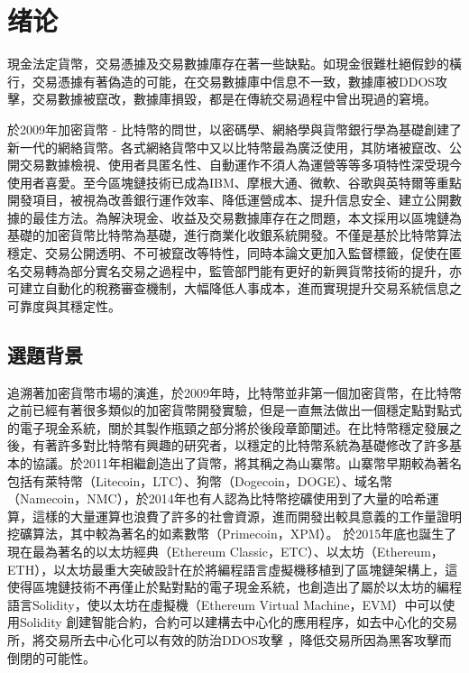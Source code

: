 
\chapter{绪论}

	現金法定貨幣，交易憑據及交易數據庫存在著一些缺點。如現金很難杜絕假鈔的橫行，交易憑據有著偽造的可能，在交易數據庫中信息不一致，數據庫被DDOS攻擊，交易數據被竄改，數據庫損毀，都是在傳統交易過程中曾出現過的窘境。

	於2009年加密貨幣 - 比特幣的問世，以密碼學、網絡學與貨幣銀行學為基礎創建了新一代的網絡貨幣。各式網絡貨幣中又以比特幣最為廣泛使用，其防堵被竄改、公開交易數據檢視、使⽤者具匿名性、⾃動運作不須⼈為運營等等多項特性深受現今使用者喜愛。至今區塊鏈技術已成為IBM、摩根大通、微軟、谷歌與英特爾等重點開發項目，被視為改善銀行運作效率、降低運營成本、提升信息安全、建立公開數據的最佳方法。為解決現金、收益及交易數據庫存在之問題，本文採用以區塊鏈為基礎的加密貨幣比特幣為基礎，進行商業化收銀系統開發。不僅是基於⽐特幣算法穩定、交易公開透明、不可被竄改等特性，同時本論⽂更加⼊監督標籤，促使在匿名交易轉為部分實名交易之過程中，監管部⾨能有更好的新興貨幣技術的提升，亦可建立自動化的稅務審查機制，大幅降低人事成本，進而實現提升交易系統信息之可靠度與其穩定性。

	\section{選題背景}

		追溯著加密貨幣市場的演進，於2009年時，比特幣並非第一個加密貨幣，在比特幣之前已經有著很多類似的加密貨幣開發實驗，但是一直無法做出一個穩定點對點式的電子現金系統，關於其製作瓶頸之部分將於後段章節闡述。在比特幣穩定發展之後，有著許多對比特幣有興趣的研究者，以穩定的比特幣系統為基礎修改了許多基本的協議。於2011年相繼創造出了貨幣，將其稱之為⼭寨幣。山寨幣早期較為著名包括有萊特幣（Litecoin，LTC）\supercite{litecoin}、狗幣（Dogecoin，DOGE）\supercite{dogecoin}、域名幣（Namecoin，NMC）\supercite{namecoin}，於2014年也有人認為比特幣挖礦使用到了大量的哈希運算，這樣的大量運算也浪費了許多的社會資源，進而開發出較具意義的工作量證明挖礦算法，其中較為著名的如素數幣（Primecoin，XPM）\supercite{primecoin}。 於2015年底也誕生了現在最為著名的以太坊經典（Ethereum Classic，ETC）\supercite{ethereumclassic}、以太坊（Ethereum，ETH）\supercite{ethereum}，以太坊最重⼤突破設計在於將編程語⾔虛擬機移植到了區塊鏈架構上，這使得區塊鏈技術不再僅止於點對點的電⼦現⾦系統，也創造出了屬於以太坊的編程語言Solidity\supercite{solidity}，使以太坊在虛擬機（Ethereum Virtual Machine，EVM）\supercite{Ethereum:Asecuredecentralisedgeneralisedtransactionledger}中可以使⽤Solidity 創建智能合約，合約可以建構去中心化的應用程序，如去中心化的交易所，將交易所去中心化可以有效的防治DDOS攻擊 \supercite{Bitcoin:Economicstechnologyandgovernance}，降低交易所因為黑客攻擊而倒閉的可能性。
		

